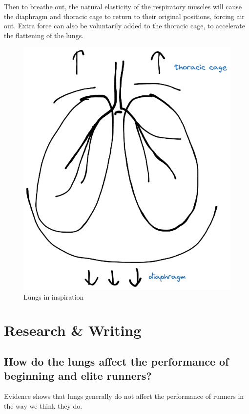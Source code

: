 \documentclass[index]{subfiles}
\begin{document}
Then to breathe out, the natural elasticity of the respiratory muscles will cause the diaphragm and thoracic cage to return to their original positions, forcing air out. Extra force can also be voluntarily added to the thoracic cage, to accelerate the flattening of the lungs.

\begin{figure}[H]
    \centering
    \includegraphics[scale=0.3]{lungs.png}
    \caption{Lungs in inspiration}
\end{figure}

\section{Research \& Writing}

\subsection{How do the lungs affect the performance of beginning and elite runners?}

Evidence shows that lungs generally do not affect the performance of runners in the way we think they do.
\end{document}
